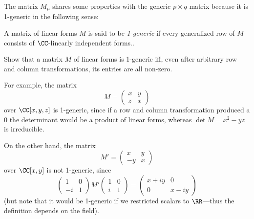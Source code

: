 % 
% 
The matrix $M_{\mu}$ shares some properties with the generic $p\times q$ matrix because
it is 1-generic in the following sense:

\begin{definition}
 A matrix of linear forms $M$ is said to be \emph{1-generic} if every generalized row of $M$
 consists of $\CC$-linearly independent forms.. 
 \end{definition}

\begin{exercise}
Show that a matrix $M$ of linear forms is 1-generic iff, even after arbitrary row and column transformations, its entries are all non-zero.
\end{exercise}
 For example, the matrix 
$$
M = \begin{pmatrix}
 x &y\\
 z&x
\end{pmatrix}
$$
over $\CC[x,y,z]$ is  1-generic, since if a row and column transformation produced a 0 the determinant would be a product of linear forms, whereas
$\det M = x^2-yz$ is irreducible. 

On the other hand, the matrix
$$
M' = \begin{pmatrix}
 x &y\\
 -y&x
\end{pmatrix}
$$
over $\CC[x,y]$ is not 1-generic, since
$$
\begin{pmatrix}
1&0\\
-i&1 
\end{pmatrix}
M'
\begin{pmatrix}
 1&0\\
 i&1
\end{pmatrix}
= 
\begin{pmatrix}
 x+iy&0\\
 0&x-iy
\end{pmatrix}
$$
(but note that it would be 1-generic if we restricted scalars to $\RR$---thus the definition depends on the field).


